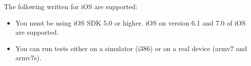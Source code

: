 The following \gdauts{} written for iOS are supported:

\begin{itemize}
\item You must be using iOS SDK 5.0 or higher. iOS \gdauts{} on version 6.1 and 7.0 of iOS are supported.
\item You can run tests either on a simulator (i386) or on a real device (armv7 and armv7s). 
\end{itemize}



